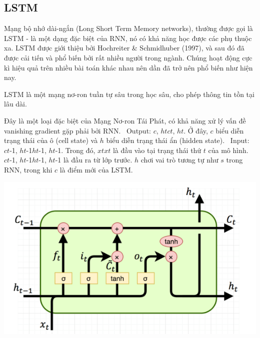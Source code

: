\subsection{LSTM}
Mạng bộ nhớ dài-ngắn (Long Short Term Memory networks), thường được gọi là LSTM - là một dạng đặc biệt của RNN, nó có khả năng học được các phụ thuộc xa. LSTM được giới thiệu bởi Hochreiter \& Schmidhuber (1997), và sau đó đã được cải tiến và phổ biến bởi rất nhiều người trong ngành. Chúng hoạt động cực kì hiệu quả trên nhiều bài toán khác nhau nên dần đã trở nên phổ biến như hiện nay.
\par
LSTM là một mạng nơ-ron tuần tự sâu trong học sâu, cho phép thông tin tồn tại lâu dài.
\par
Đây là một loại đặc biệt của Mạng Nơ-ron Tái Phát, có khả năng xử lý vấn đề vanishing gradient gặp phải bởi RNN.
    \indent\textbullet\ Output: \(c\), \(htct\), \(ht\). Ở đây, \(c\) biểu diễn trạng thái của ô (cell state) và \(h\) biểu diễn trạng thái ẩn (hidden state).
    \indent\textbullet\ Input: \(ct\)-1, \(ht\)-1\(ht\)-1, \(ht\)-1. Trong đó, \(xtxt\) là đầu vào tại trạng thái thứ \(t\) của mô hình. \(ct\)-1, \(ht\)-1\(ht\)-1, \(ht\)-1 là đầu ra từ lớp trước. \(h\) chơi vai trò tương tự như \(s\) trong RNN, trong khi \(c\) là điểm mới của LSTM.

\begin{minipage}{0.5\textwidth}
\centering
\includegraphics[width=1\textwidth]{resources/chapter-4/lstm-1.png}
\end{minipage}

